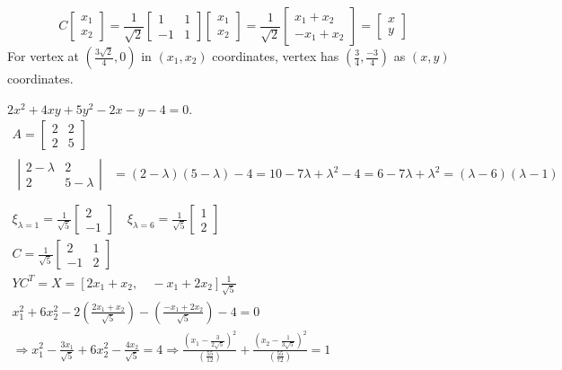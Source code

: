 \documentclass[twoside]{amsart}
\theoremstyle{plain}
\theoremstyle{definition}
\newcommand{\exercisehead}[1]
  {
   \noindent{\small\bf Exercise #1.}
   \smallskip}
\begin{document}
\[
C\left[ \begin{matrix} x_1 \\ x_2 \end{matrix} \right] = \frac{1}{\sqrt{2}} \left[ \begin{matrix} 1 & 1 \\ -1 & 1 \end{matrix} \right] \left[ \begin{matrix} x_1 \\ x_2 \end{matrix} \right] = \frac{1}{\sqrt{2}} \left[ \begin{matrix} x_1 + x_2 \\ -x_1 + x_2 \end{matrix} \right] = \left[ \begin{matrix} x \\ y \end{matrix} \right] 
\]
For vertex at $\left( \frac{3\sqrt{2}}{4} , 0 \right)$ in $(x_1,x_2)$ coordinates, vertex has $\left( \frac{3}{4} , \frac{-3}{4} \right)$ as $(x,y)$ coordinates. 

\exercisehead{16} $2x^2 + 4xy + 5 y^2 - 2x - y -4 = 0$.  
\[
\begin{gathered}
  A = \left[ \begin{matrix} 2 & 2 \\ 2 & 5 \end{matrix} \right] \\
  \begin{aligned}
    \left| \begin{matrix} 2 - \lambda & 2 \\ 2 & 5 - \lambda \end{matrix} \right| & = (2-\lambda)(5- \lambda) - 4 = 10 - 7\lambda + \lambda^2 -4 = 6 - 7 \lambda + \lambda^2 = (\lambda - 6 )(\lambda -1 ) \\
  \end{aligned} \\
    \xi_{\lambda = 1 } = \frac{1}{\sqrt{5}} \left[ \begin{matrix} 2 \\ -1 \end{matrix} \right] \quad \xi_{\lambda =6} = \frac{1}{\sqrt{5}} \left[ \begin{matrix} 1 \\ 2 \end{matrix} \right] \\
    C = \frac{1}{\sqrt{5}} \left[ \begin{matrix} 2 & 1 \\ -1 & 2 \end{matrix} \right] \\
    YC^T = X = [ 2x_1 + x_2 , \quad -x_1 + 2x_2 ] \frac{1}{\sqrt{5}} \\
    x_1^2 + 6x_2^2 - 2 \left( \frac{ 2x_1 + x_2 }{ \sqrt{5}} \right) - \left( \frac{ -x_1 + 2 x_2 }{ \sqrt{5}} \right) - 4 = 0 \\
    \Longrightarrow x_1^2 - \frac{3x_1}{\sqrt{5}} + 6 x_2^2 - \frac{4 x_2}{\sqrt{5}} = 4 \Longrightarrow \frac{ \left( x_1 - \frac{3}{ 2\sqrt{5}} \right)^2}{ \left( \frac{55}{12} \right)} +  \frac{ \left( x_2 - \frac{1}{3\sqrt{5}} \right)^2  }{ \left( \frac{55}{72} \right) } = 1 
\end{gathered}
\]
\end{document}
